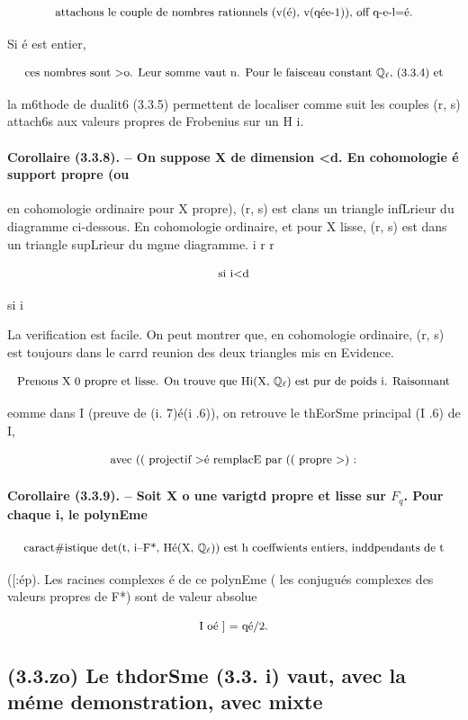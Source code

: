 \documentclass[11pt]{article}
\theoremstyle{remark}
\begin{document}
\[\text{\small attachons le couple de nombres rationnels (v(é), v(qée-1)), off q-e-l=é.}\]

Si é est entier,

\[\text{\small ces nombres sont >o. Leur somme vaut n. Pour le faisceau constant \(\mathbb{Q}_{\ell}\), (3.3.4) et}\]

la m6thode de dualit6 (3.3.5) permettent de localiser comme suit les couples (r, s) attach6s aux valeurs propres de Frobenius sur un H i.

\paragraph{Corollaire (3.3.8). -- On suppose X de dimension <d. En cohomologie é support propre (ou}

en cohomologie ordinaire pour X propre), (r, s) est clans un triangle infLrieur du diagramme ci-dessous. En cohomologie ordinaire, et pour X lisse, (r, s) est dans un triangle supLrieur du mgme diagramme. i r r

\[\text{\small si i<d}\]

si i

La verification est facile. On peut montrer que, en cohomologie ordinaire, (r, s) est toujours dans le carrd reunion des deux triangles mis en Evidence.

\[\text{\small Prenons X 0 propre et lisse. On trouve que Hi(X, \(\mathbb{Q}_{\ell}\)) est pur de poids i. Raisonnant}\]

eomme dans I (preuve de (i. 7)é(i .6)), on retrouve le thEorSme principal (I .6) de I,

\[\text{\small avec (( projectif >é remplacE par (( propre >) :}\]

\paragraph{Corollaire (3.3.9). -- Soit X o une varigtd propre et lisse sur \(F_q\). Pour chaque i, le polynEme}

\[\text{\small caract\#istique det(t, i--F*, Hé(X, \(\mathbb{Q}_{\ell}\))) est h coeffwients entiers, inddpendants de t}\]

([:ép). Les racines complexes é de ce polynEme ( les conjugués complexes des valeurs propres de F*) sont de valeur absolue

\[\text{\small I oé ] = qé/2.}\]

\subsection*{(3.3.zo) Le thdorSme (3.3. i) vaut, avec la méme demonstration, avec mixte}
\end{document}

